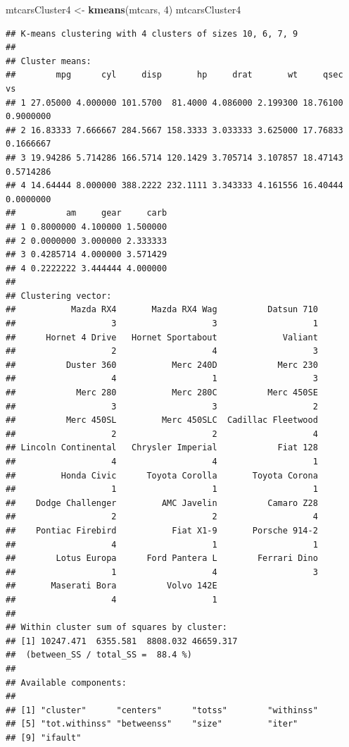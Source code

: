 \documentclass[]{book}
\newenvironment{Shaded}{\begin{snugshade}}{\end{snugshade}}
\newcommand{\DecValTok}[1]{\textcolor[rgb]{0.00,0.00,0.81}{#1}}
\newcommand{\KeywordTok}[1]{\textcolor[rgb]{0.13,0.29,0.53}{\textbf{#1}}}
\newcommand{\NormalTok}[1]{#1}
\newcommand{\StringTok}[1]{\textcolor[rgb]{0.31,0.60,0.02}{#1}}
\begin{document}
\begin{Shaded}
\begin{Highlighting}[]
\NormalTok{mtcarsCluster4 <-}\StringTok{ }\KeywordTok{kmeans}\NormalTok{(mtcars, }\DecValTok{4}\NormalTok{)}
\NormalTok{mtcarsCluster4}
\end{Highlighting}
\end{Shaded}

\begin{verbatim}
## K-means clustering with 4 clusters of sizes 10, 6, 7, 9
## 
## Cluster means:
##        mpg      cyl     disp       hp     drat       wt     qsec        vs
## 1 27.05000 4.000000 101.5700  81.4000 4.086000 2.199300 18.76100 0.9000000
## 2 16.83333 7.666667 284.5667 158.3333 3.033333 3.625000 17.76833 0.1666667
## 3 19.94286 5.714286 166.5714 120.1429 3.705714 3.107857 18.47143 0.5714286
## 4 14.64444 8.000000 388.2222 232.1111 3.343333 4.161556 16.40444 0.0000000
##          am     gear     carb
## 1 0.8000000 4.100000 1.500000
## 2 0.0000000 3.000000 2.333333
## 3 0.4285714 4.000000 3.571429
## 4 0.2222222 3.444444 4.000000
## 
## Clustering vector:
##           Mazda RX4       Mazda RX4 Wag          Datsun 710 
##                   3                   3                   1 
##      Hornet 4 Drive   Hornet Sportabout             Valiant 
##                   2                   4                   3 
##          Duster 360           Merc 240D            Merc 230 
##                   4                   1                   3 
##            Merc 280           Merc 280C          Merc 450SE 
##                   3                   3                   2 
##          Merc 450SL         Merc 450SLC  Cadillac Fleetwood 
##                   2                   2                   4 
## Lincoln Continental   Chrysler Imperial            Fiat 128 
##                   4                   4                   1 
##         Honda Civic      Toyota Corolla       Toyota Corona 
##                   1                   1                   1 
##    Dodge Challenger         AMC Javelin          Camaro Z28 
##                   2                   2                   4 
##    Pontiac Firebird           Fiat X1-9       Porsche 914-2 
##                   4                   1                   1 
##        Lotus Europa      Ford Pantera L        Ferrari Dino 
##                   1                   4                   3 
##       Maserati Bora          Volvo 142E 
##                   4                   1 
## 
## Within cluster sum of squares by cluster:
## [1] 10247.471  6355.581  8808.032 46659.317
##  (between_SS / total_SS =  88.4 %)
## 
## Available components:
## 
## [1] "cluster"      "centers"      "totss"        "withinss"    
## [5] "tot.withinss" "betweenss"    "size"         "iter"        
## [9] "ifault"
\end{verbatim}
\end{document}
